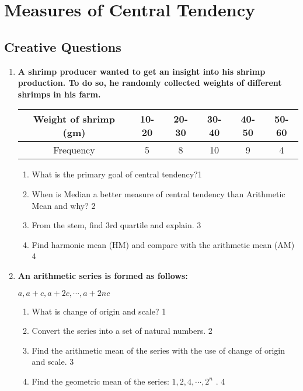 \documentclass[a4paper,oneside]{book}
\begin{document}
\chapter{Measures of Central Tendency} 
\section{Creative Questions}
\begin{enumerate}

     \item
	  \textbf{A shrimp producer wanted to get an insight into his shrimp production. To do so, he randomly collected weights of different shrimps in his farm.} 
	  

	  \begin{table}[h]
	  \centering
\begin{tabular}{c|c|c|c|c|c}
Weight of shrimp (gm) & 10-20 & 20-30 & 30-40 & 40-50 & 50-60 \\ \hline
Frequency & 5 & 8 & 10 & 9 & 4
\end{tabular}
\end{table}

  \begin{enumerate}
    \item
	What is the primary goal of central tendency?\hfill 1
    \item
	When is Median a better measure of central tendency than Arithmetic Mean and why? \hfill 2
    \item  
	From the stem, find 3rd quartile and explain. \hfill 3
    \item
	Find harmonic mean (HM) and compare with the arithmetic mean (AM) \hfill 4
  \end{enumerate}

 \item
	  \textbf{An arithmetic series is formed as follows:}
	  
	   \begin{center}
  \textbf{$a, a+c, a+2c, \cdots, a+2nc$}
  \end{center}
  
  \begin{enumerate}
    \item
	What is change of origin and scale? \hfill 1
    \item
	Convert the series into a set of natural numbers. \hfill 2
    \item  
	Find the arithmetic mean of the series with the use of change of origin and scale. \hfill 3
    \item
	Find the geometric mean of the series: $1, 2, 4, \cdots , 2^n$ . \hfill 4
  \end{enumerate}


\end{enumerate}
\end{document}
